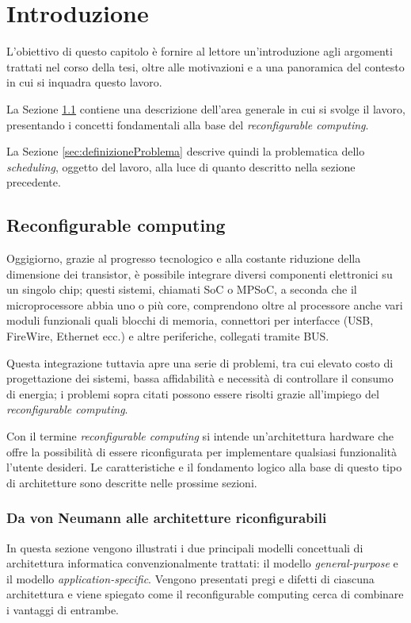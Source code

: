 \chapter{Introduzione}
\label{chap:intro}
\vspace{1cm}
L'obiettivo di questo capitolo è fornire al lettore un'introduzione agli argomenti 
trattati nel corso della tesi, oltre alle motivazioni e a una panoramica del contesto in 
cui si inquadra questo lavoro.

La Sezione \ref{sec:reconfComp} contiene una descrizione dell'area generale in cui si 
svolge il lavoro, presentando i concetti fondamentali alla base del \emph{reconfigurable 
computing}.

La Sezione \ref{sec:definizioneProblema} descrive quindi la problematica dello 
\emph{scheduling}, oggetto del lavoro, alla luce di quanto descritto nella sezione 
precedente.


\section{Reconfigurable computing}
\label{sec:reconfComp}
Oggigiorno, grazie al progresso tecnologico e alla costante riduzione della dimensione 
dei transistor, è possibile integrare diversi componenti elettronici su un singolo chip; 
questi sistemi, chiamati \ac{SoC} o \ac{MPSoC}, a seconda che il microprocessore abbia 
uno o più core, comprendono oltre al processore anche vari moduli funzionali quali 
blocchi di memoria, connettori per interfacce (USB, FireWire, Ethernet ecc.) e altre 
periferiche, collegati tramite BUS.

Questa integrazione tuttavia apre una serie di problemi, tra cui elevato costo di 
progettazione dei sistemi, bassa affidabilità e necessità di controllare il consumo di 
energia; i problemi sopra citati possono essere risolti grazie all'impiego del 
\emph{reconfigurable computing}.

Con il termine \emph{reconfigurable computing} si intende un'architettura hardware che 
offre la possibilità di essere riconfigurata per implementare qualsiasi funzionalità 
l'utente desideri. Le caratteristiche e il fondamento logico alla base di questo tipo di 
architetture sono descritte nelle prossime sezioni.

\subsection{Da von Neumann alle architetture riconfigurabili}
\label{subsec:cambioParadigma}
In questa sezione vengono illustrati i due principali modelli concettuali di architettura
informatica convenzionalmente trattati: il modello \emph{general-purpose} e il modello
\emph{application-specific}. Vengono presentati pregi e difetti di ciascuna architettura
e viene spiegato come il reconfigurable computing cerca di combinare i vantaggi di
entrambe.


